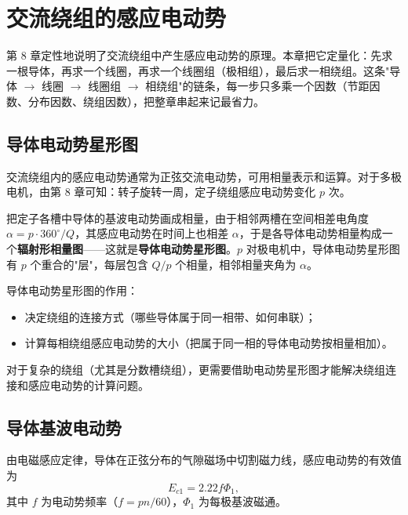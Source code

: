 \chapter{交流绕组的感应电动势}

第 8 章定性地说明了交流绕组中产生感应电动势的原理。本章把它定量化：先求一根导体，再求一个线圈，再求一个线圈组（极相组），最后求一相绕组。这条"导体 $\rightarrow$ 线圈 $\rightarrow$ 线圈组 $\rightarrow$ 相绕组"的链条，每一步只多乘一个因数（节距因数、分布因数、绕组因数），把整章串起来记最省力。

\section{导体电动势星形图}

交流绕组内的感应电动势通常为正弦交流电动势，可用相量表示和运算。对于多极电机，由第 8 章可知：转子旋转一周，定子绕组感应电动势变化 $p$ 次。

把定子各槽中导体的基波电动势画成相量，由于相邻两槽在空间相差电角度 $\alpha=p\cdot360^\circ/Q$，其感应电动势在时间上也相差 $\alpha$，于是各导体电动势相量构成一个\textbf{辐射形相量图}——这就是\textbf{导体电动势星形图}。$p$ 对极电机中，导体电动势星形图有 $p$ 个重合的"层"，每层包含 $Q/p$ 个相量，相邻相量夹角为 $\alpha$。

导体电动势星形图的作用：
\begin{itemize}
  \item 决定绕组的连接方式（哪些导体属于同一相带、如何串联）；
  \item 计算每相绕组感应电动势的大小（把属于同一相的导体电动势按相量相加）。
\end{itemize}
对于复杂的绕组（尤其是分数槽绕组），更需要借助电动势星形图才能解决绕组连接和感应电动势的计算问题。

\section{导体基波电动势}

由电磁感应定律，导体在正弦分布的气隙磁场中切割磁力线，感应电动势的有效值为
\begin{equation}
E_{c1}=2.22f\Phi_1 ,
\end{equation}
其中 $f$ 为电动势频率（$f=pn/60$），$\Phi_1$ 为每极基波磁通。

